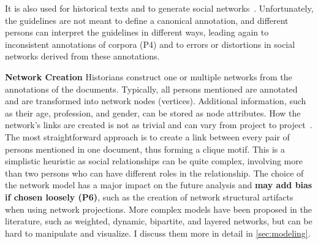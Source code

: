 It is also used for historical texts and to generate social networks~\cite{dufournaudComparaisonOutilsPour2006, serranomolineroUnderstandingUseVistorian2017}.
Unfortunately, the guidelines are not meant to define a canonical annotation, and different persons can interpret the guidelines in different ways, leading again to inconsistent annotations of corpora (P4) and to errors or distortions in social networks derived from these annotations.

\noindent\textbf{Network Creation}
Historians construct one or multiple networks from the annotations of the documents.
Typically, all persons mentioned are annotated and are transformed into network nodes (vertices).
Additional information, such as their age, profession, and gender, can be stored as node attributes.
How the network's links are created is not as trivial and can vary from project to project~\cite{alkadi2022}.
The most straightforward approach is to create a link between every pair of persons mentioned in one document, thus forming a clique motif.
This is a simplistic heuristic as social relationships can be quite complex, involving more than two persons who can have different roles in the relationship.
The choice of the network model has a major impact on the future analysis and \textbf{may add bias if chosen loosely (P6)}, such as the creation of network structural artifacts when using network projections\cite{cristofoliAuxSourcesGrands2008}.
More complex models have been proposed in the literature, such as weighted, dynamic, bipartite, and layered networks, but can be hard to manipulate and visualize. I discuss them more in detail in \autoref{sec:modeling}.

